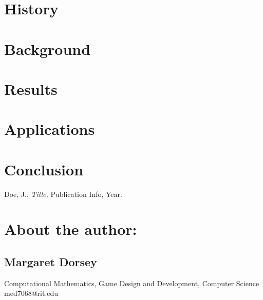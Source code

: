 \documentclass{article}
\begin{document}
\section{History}\label{History}
  

\section{Background}\label{Background}

\section{Results}\label{Results}

\section{Applications}\label{Applications}

\section{Conclusion}\label{Conclusion}



\begin{thebibliography}{9}


         {\sc Doe, J.,}
         {\em Title,}
         Publication Info, Year.


\end{thebibliography}


\section*{About the author:}



\subsection*{Margaret Dorsey}
   Computational Mathematics, Game Design and Development, Computer Science
   med7068@rit.edu
\end{document}
